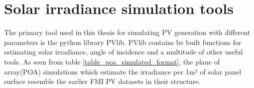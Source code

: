 \chapter{Solar irradiance simulation tools}
The primary tool used in this thesis for simulating PV generation with different parameters is the python library PVlib. PVlib contains be built functions for estimating solar irradiance, angle of incidence and a multitude of other useful tools. As seen from table \ref{table_poa_simulated_format}, the plane of array(POA) simulations which estimate the irradiance per 1m² of solar panel surface resemble the earlier FMI PV datasets in their structure.









